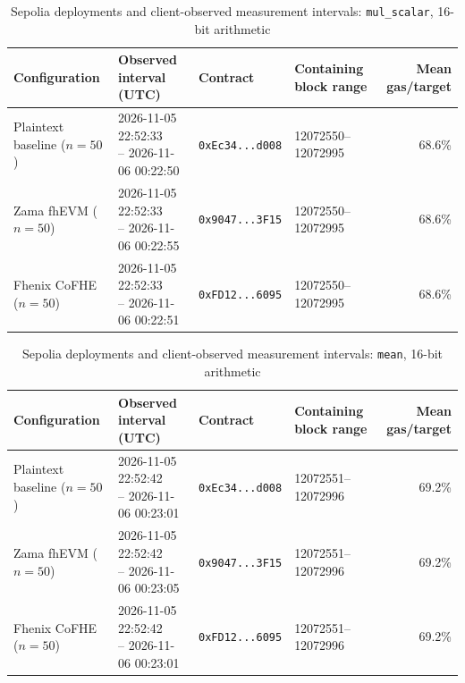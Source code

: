 \begin{table}[!t]
\caption{Sepolia deployments and client-observed measurement intervals: \texttt{mul\_scalar}, 16-bit arithmetic}
\label{tab:sepolia-client-intervals-classic-euint16-mul-scalar}
\centering
\footnotesize
\setlength{\tabcolsep}{4pt}
\begin{tabular}{|l|l|l|l|r|}
\hline
\textbf{Configuration} &
\textbf{Observed interval (UTC)} &
\textbf{Contract} &
\textbf{Containing block range} &
\textbf{Mean gas/target} \\
\hline
Plaintext baseline (\(n=50\)) &
\shortstack[l]{2026-11-05 22:52:33 \\ -- 2026-11-06 00:22:50} &
\texttt{0xEc34...d008} &
12072550--12072995 &
68.6\% \\
\hline
Zama fhEVM (\(n=50\)) &
\shortstack[l]{2026-11-05 22:52:33 \\ -- 2026-11-06 00:22:55} &
\texttt{0x9047...3F15} &
12072550--12072995 &
68.6\% \\
\hline
Fhenix CoFHE (\(n=50\)) &
\shortstack[l]{2026-11-05 22:52:33 \\ -- 2026-11-06 00:22:51} &
\texttt{0xFD12...6095} &
12072550--12072995 &
68.6\% \\
\hline
\end{tabular}
\end{table}

\begin{table}[!t]
\caption{Sepolia deployments and client-observed measurement intervals: \texttt{mean}, 16-bit arithmetic}
\label{tab:sepolia-client-intervals-classic-euint16-mean}
\centering
\footnotesize
\setlength{\tabcolsep}{4pt}
\begin{tabular}{|l|l|l|l|r|}
\hline
\textbf{Configuration} &
\textbf{Observed interval (UTC)} &
\textbf{Contract} &
\textbf{Containing block range} &
\textbf{Mean gas/target} \\
\hline
Plaintext baseline (\(n=50\)) &
\shortstack[l]{2026-11-05 22:52:42 \\ -- 2026-11-06 00:23:01} &
\texttt{0xEc34...d008} &
12072551--12072996 &
69.2\% \\
\hline
Zama fhEVM (\(n=50\)) &
\shortstack[l]{2026-11-05 22:52:42 \\ -- 2026-11-06 00:23:05} &
\texttt{0x9047...3F15} &
12072551--12072996 &
69.2\% \\
\hline
Fhenix CoFHE (\(n=50\)) &
\shortstack[l]{2026-11-05 22:52:42 \\ -- 2026-11-06 00:23:01} &
\texttt{0xFD12...6095} &
12072551--12072996 &
69.2\% \\
\hline
\end{tabular}
\end{table}

